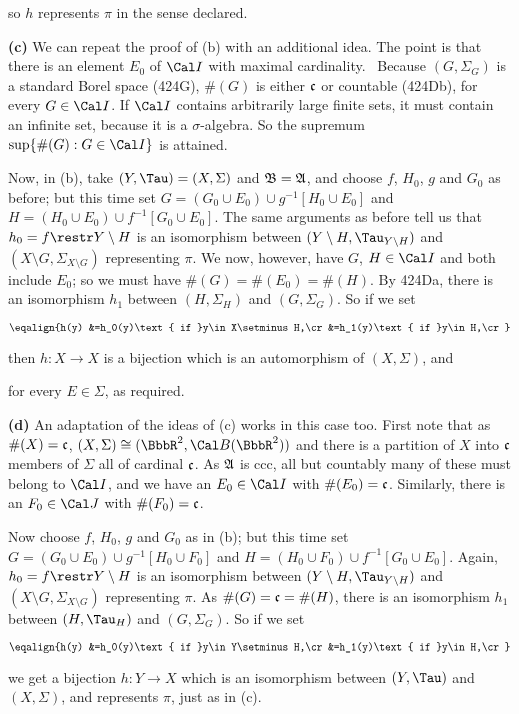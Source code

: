 {

\noindent so $h$ represents $\pi$ in the sense declared.

\medskip

{\bf (c)} We can repeat the proof of (b) with an additional idea.   The
point is that there is an element $E_0$ of $\Cal I$ with maximal
cardinality.   \Prf\ Because $(G,\Sigma_G)$ is a standard Borel space
(424G), $\#(G)$ is either $\frak c$ or countable (424Db), 
for every $G\in\Cal I$.
If $\Cal I$ contains arbitrarily large finite sets, it must contain an
infinite set, because it is a $\sigma$-algebra.   So the supremum
$\sup\{\#(G):G\in\Cal I\}$ is attained.\ \Qed

Now, in (b), take $(Y,\Tau)=(X,\Sigma)$ and $\frak B=\frak A$, and choose
$f$, $H_0$, $g$ and $G_0$ as before;  but this time set
$G=(G_0\cup E_0)\cup g^{-1}[H_0\cup E_0]$ and
$H=(H_0\cup E_0)\cup f^{-1}[G_0\cup E_0]$.   The same arguments as before
tell us that $h_0=f\restr Y\setminus H$ is an isomorphism between
$(Y\setminus H,\Tau_{Y\setminus H})$ and
$(X\setminus G,\Sigma_{X\setminus G})$ representing $\pi$.   We now,
however, have $G$, $H\in\Cal I$ and both include $E_0$;  so
we must have $\#(G)=\#(E_0)=\#(H)$.   By 424Da, there is an isomorphism
$h_1$ between $(H,\Sigma_H)$ and $(G,\Sigma_G)$.   So if we set

$$\eqalign{h(y)
&=h_0(y)\text{ if }y\in X\setminus H,\cr
&=h_1(y)\text{ if }y\in H,\cr}$$

\noindent then $h:X\to X$ is a bijection which is an automorphism
of $(X,\Sigma)$, and


\noindent for every $E\in\Sigma$, as required.

\medskip

{\bf (d)} An adaptation of the ideas of (c) works in this case too.
First note that as $\#(X)=\frak c$,
$(X,\Sigma)\cong(\BbbR^2,\Cal B(\BbbR^2))$ and there is a partition
of $X$ into $\frak c$ members of $\Sigma$ all of cardinal $\frak c$.
As $\frak A$ is ccc, all but countably many
of these must belong to $\Cal I$, and we have an $E_0\in\Cal I$ with
$\#(E_0)=\frak c$.   Similarly, there is an $F_0\in\Cal J$ with
$\#(F_0)=\frak c$.

Now choose
$f$, $H_0$, $g$ and $G_0$ as in (b);  but this time set
$G=(G_0\cup E_0)\cup g^{-1}[H_0\cup F_0]$ and
$H=(H_0\cup F_0)\cup f^{-1}[G_0\cup E_0]$.   Again,
$h_0=f\restr Y\setminus H$ is an isomorphism between
$(Y\setminus H,\Tau_{Y\setminus H})$ and
$(X\setminus G,\Sigma_{X\setminus G})$ representing $\pi$.   As
$\#(G)=\frak c=\#(H)$, there is an isomorphism
$h_1$ between $(H,\Tau_H)$ and $(G,\Sigma_G)$.   So if we set

$$\eqalign{h(y)
&=h_0(y)\text{ if }y\in Y\setminus H,\cr
&=h_1(y)\text{ if }y\in H,\cr}$$

\noindent we get a bijection $h:Y\to X$ which is an isomorphism between
$(Y,\Tau)$ and $(X,\Sigma)$, and represents $\pi$, just as in (c).
}%
